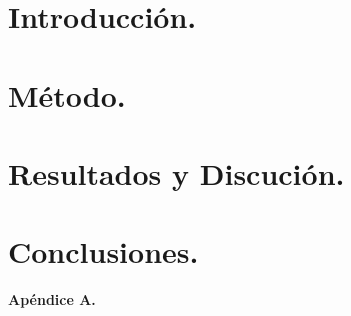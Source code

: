 \documentclass[a4paper,11pt]{extarticle} %
\begin{document}
\vspace{0.35em}



\begin{multicols}{2}
	\section{Introducción.}

	

	

	\section{Método.}

	

	\section{Resultados y Discución.}

	

	\section{Conclusiones.}

	

	\printbibliography[title={Referencias.}]

\end{multicols}


{\large \textbf{Apéndice A.}}

\end{document}

